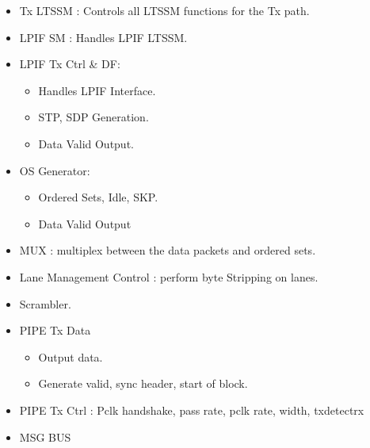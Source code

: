     \begin{itemize}
      \item Tx LTSSM : Controls all LTSSM functions for the Tx path.
      \item LPIF SM : Handles LPIF LTSSM.
      \item LPIF Tx Ctrl \& DF:
      \begin{itemize}
        \item Handles LPIF Interface.
        \item STP, SDP Generation.
        \item Data Valid Output.
      \end{itemize}
      \item OS Generator:
      \begin{itemize}
        \item Ordered Sets, Idle, SKP.
        \item Data Valid Output
      \end{itemize}
      \item MUX : multiplex between the data packets and ordered sets.
      \item Lane Management Control : perform byte Stripping on lanes.
      \item Scrambler.
      \item PIPE Tx Data
      \begin{itemize}
        \item Output data.
        \item Generate valid, sync header, start of block.
      \end{itemize}
      \item PIPE Tx Ctrl : Pclk handshake, pass rate, pclk rate, width, txdetectrx
      \item MSG BUS
    \end{itemize}
